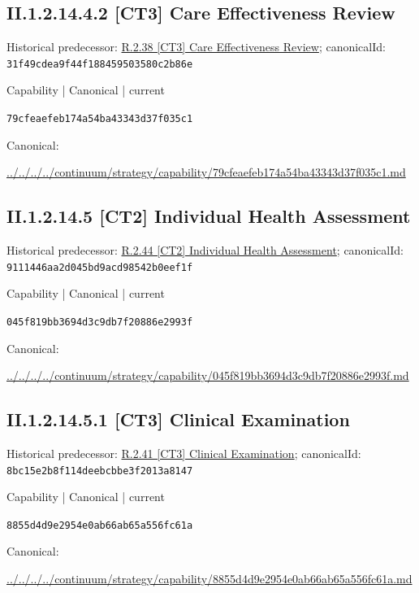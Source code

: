 \documentclass[10pt,a4paper]{article}
\begin{document}
\subsection*{II.1.2.14.4.2 [CT3] Care Effectiveness Review}
Historical predecessor: \hyperref[element-31f49cdea9f44f188459503580c2b86e]{R.2.38 [CT3] Care Effectiveness Review}; canonicalId: \texttt{31f49cdea9f44f188459503580c2b86e}\par
\label{element-79cfeaefeb174a54ba43343d37f035c1}
{\small Capability | Canonical | current}\par
\texttt{79cfeaefeb174a54ba43343d37f035c1}\par
Canonical: \par
{\footnotesize\url{../../../../continuum/strategy/capability/79cfeaefeb174a54ba43343d37f035c1.md}}\par
\subsection*{II.1.2.14.5 [CT2] Individual Health Assessment}
Historical predecessor: \hyperref[element-9111446aa2d045bd9acd98542b0eef1f]{R.2.44 [CT2] Individual Health Assessment}; canonicalId: \texttt{9111446aa2d045bd9acd98542b0eef1f}\par
\label{element-045f819bb3694d3c9db7f20886e2993f}
{\small Capability | Canonical | current}\par
\texttt{045f819bb3694d3c9db7f20886e2993f}\par
Canonical: \par
{\footnotesize\url{../../../../continuum/strategy/capability/045f819bb3694d3c9db7f20886e2993f.md}}\par
\subsection*{II.1.2.14.5.1 [CT3] Clinical Examination}
Historical predecessor: \hyperref[element-8bc15e2b8f114deebcbbe3f2013a8147]{R.2.41 [CT3] Clinical Examination}; canonicalId: \texttt{8bc15e2b8f114deebcbbe3f2013a8147}\par
\label{element-8855d4d9e2954e0ab66ab65a556fc61a}
{\small Capability | Canonical | current}\par
\texttt{8855d4d9e2954e0ab66ab65a556fc61a}\par
Canonical: \par
{\footnotesize\url{../../../../continuum/strategy/capability/8855d4d9e2954e0ab66ab65a556fc61a.md}}\par
\end{document}

